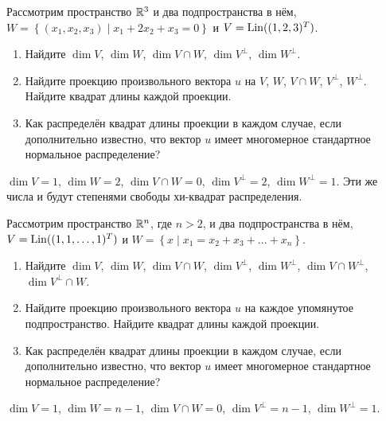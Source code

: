 \begin{problem}
Рассмотрим пространство $\mathbb R^3$ и два подпространства в нём, $W = \left\{ (x_1, x_2, x_3) \mid x_1 + 2x_2 + x_3 =0 \right\}$ и $V = \operatorname{Lin}((1,2,3)^T)$.

\begin{enumerate}
\item Найдите $\dim V$, $\dim W$, $\dim V \cap W$, $\dim V^{\perp}$, $\dim W^{\perp}$.
\item Найдите проекцию произвольного вектора $u$ на $V$, $W$, $V\cap W$, $V^{\perp}$,
$W^{\perp}$. Найдите квадрат длины каждой проекции.
\item Как распределён квадрат длины проекции в каждом случае,
если дополнительно известно,
что вектор $u$ имеет многомерное стандартное нормальное распределение?
\end{enumerate}

\begin{sol}
$\dim V = 1$, $\dim W = 2$, $\dim V \cap W =0$, $\dim V^{\perp}=2$, $\dim W^{\perp}=1$.
Эти же числа и будут степенями свободы хи-квадрат распределения.
\end{sol}
\end{problem}





\begin{problem}
Рассмотрим пространство $\mathbb R^n$, где $n>2$, и два подпространства в нём, $V = \operatorname{Lin}((1,1, \ldots, 1)^T)$
и $W = \left\{ x \mid x_1 = x_2 + x_3  + \ldots + x_n \right\}$.

\begin{enumerate}
\item Найдите $\dim V$, $\dim W$, $\dim V \cap W$, $\dim V^{\perp}$,
$\dim W^{\perp}$, $\dim V \cap W^{\perp}$, $\dim V^{\perp} \cap W$.

\item Найдите проекцию произвольного вектора $u$ на каждое упомянутое подпространство.
Найдите квадрат длины каждой проекции.
\item Как распределён квадрат длины проекции в каждом случае,
если дополнительно известно,
что вектор $u$ имеет многомерное стандартное нормальное распределение?
\end{enumerate}

\begin{sol}
$\dim V = 1$, $\dim W = n-1$, $\dim V \cap W =0$, $\dim V^{\perp}=n-1$, $\dim W^{\perp}=1$.
\end{sol}
\end{problem}

